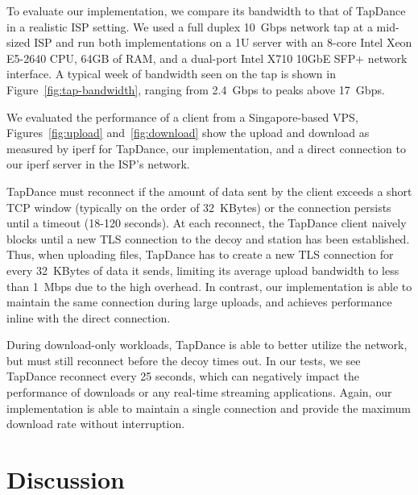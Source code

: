 \documentclass[letterpaper,twocolumn,10pt]{article}
\newcommand{\TODO}[1]{\hl{TODO: #1}\xspace}
\begin{document}


\FigTapBandwidth

\FigUpload

\FigDownload

To evaluate our \scheme implementation, we compare its bandwidth
to that of TapDance in a realistic ISP setting. We used a full duplex 10~Gbps
network tap at a mid-sized ISP and run both implementations on a 1U server with
an 8-core Intel Xeon E5-2640 CPU, 64GB of RAM, and a dual-port Intel X710 10GbE SFP+
network interface. A typical week of bandwidth seen on the tap is
shown in Figure~\ref{fig:tap-bandwidth}, ranging from 2.4~Gbps to peaks above
17~Gbps.


We evaluated the performance of a client from a Singapore-based VPS,
Figures~\ref{fig:upload} and~\ref{fig:download} show the upload and download as
measured by iperf for TapDance, our \scheme implementation, and a direct
connection to our iperf server in the ISP's network.

TapDance must reconnect if the amount of data sent by the client
exceeds a short TCP window (typically on the order of 32~KBytes) or the
connection persists until a timeout (18-120 seconds). At each reconnect, the
TapDance client naively blocks until a new TLS connection to the decoy and
station has been established. Thus, when uploading files, TapDance has to create
a new TLS connection for every 32~KBytes of data it sends, limiting its average
upload bandwidth to less than 1~Mbps due to the high overhead. In contrast,
our \scheme implementation is
able to maintain the same connection during large uploads, and achieves
performance inline with the direct connection.

During download-only workloads, TapDance is able to better utilize the network,
but must still reconnect before the decoy times out. In our tests, we see
TapDance reconnect every 25 seconds, which can negatively impact the performance of
downloads or any real-time streaming applications. Again, our \scheme
implementation is able to maintain a single connection and provide the maximum
download rate without interruption.



\section{Discussion}
\end{document}
